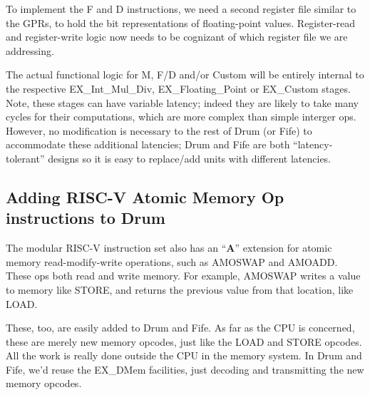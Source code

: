 To implement the F and D instructions, we need a second register file
similar to the GPRs, to hold the bit representations of floating-point
values.  Register-read and register-write logic now needs to be
cognizant of which register file we are addressing.


The actual functional logic for M, F/D and/or Custom will be entirely
internal to the respective EX\_Int\_Mul\_Div, EX\_Floating\_Point or
EX\_Custom stages.  Note, these stages can have variable latency;
indeed they are likely to take many cycles for their computations,
which are more complex than simple interger ops.  However, no
modification is necessary to the rest of Drum (or Fife) to accommodate
these additional latencies; Drum and Fife are both
``latency-tolerant'' designs so it is easy to replace/add units with
different latencies.


\subsection{Adding RISC-V Atomic Memory Op instructions to Drum}


The modular RISC-V instruction set also has an ``{\bf A}'' extension
for atomic memory read-modify-write operations, such as AMOSWAP and
AMOADD.  These ops both read and write memory.  For example, AMOSWAP
writes a value to memory like STORE, and returns the previous value
from that location, like LOAD.

These, too, are easily added to Drum and Fife.  As far as the CPU is
concerned, these are merely new memory opcodes, just like the LOAD and
STORE opcodes.  All the work is really done outside the CPU in the
memory system.  In Drum and Fife, we'd reuse the EX\_DMem facilities,
just decoding and transmitting the new memory opcodes.

